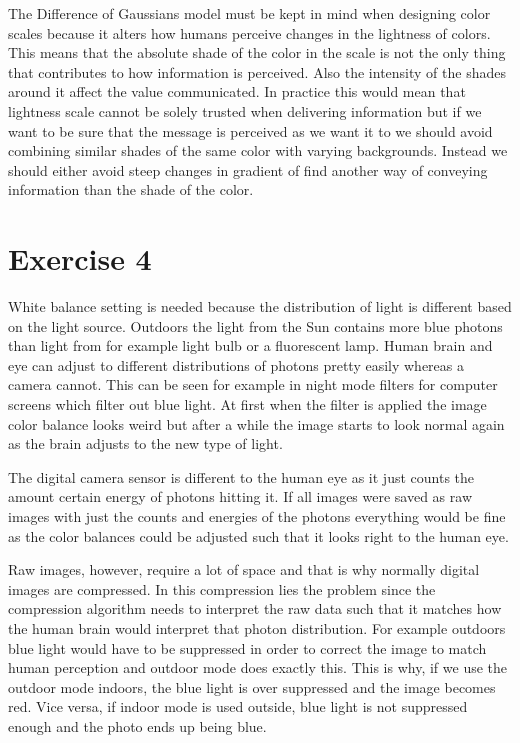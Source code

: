\documentclass{article}
\begin{document}
The Difference of Gaussians model must be kept in mind when designing color scales because it alters how humans perceive changes in the lightness of colors. This means that the absolute shade of the color in the scale is not the only thing that contributes to how information is perceived. Also the intensity of the shades around it affect the value communicated. In practice this would mean that lightness scale cannot be solely trusted when delivering information but if we want to be sure that the message is perceived as we want it to we should avoid combining similar shades of the same color with varying backgrounds. Instead we should either avoid steep changes in gradient of find another way of conveying information than the shade of the color. 

\newpage
\section*{Exercise 4}

White balance setting is needed because the distribution of light is different based on the light source. Outdoors the light from the Sun contains more blue photons than light from for example light bulb or a fluorescent lamp. Human brain and eye can adjust to different distributions of photons pretty easily whereas a camera cannot. This can be seen for example in night mode filters for computer screens which filter out blue light. At first when the filter is applied the image color balance looks weird but after a while the image starts to look normal again as the brain adjusts to the new type of light.

The digital camera sensor is different to the human eye as it just counts the amount certain energy of photons hitting it. If all images were saved as raw images with just the counts and energies of the photons everything would be fine as the color balances could be adjusted such that it looks right to the human eye. 

Raw images, however, require a lot of space and that is why normally digital images are compressed. In this compression lies the problem since the compression algorithm needs to interpret the raw data such that it matches how the human brain would interpret that photon distribution. For example outdoors blue light would have to be suppressed in order to correct the image to match human perception and outdoor mode does exactly this. This is why, if we use the outdoor mode indoors, the blue light is over suppressed and the image becomes red. Vice versa, if indoor mode is used outside, blue light is not suppressed enough and the photo ends up being blue.
\end{document}
